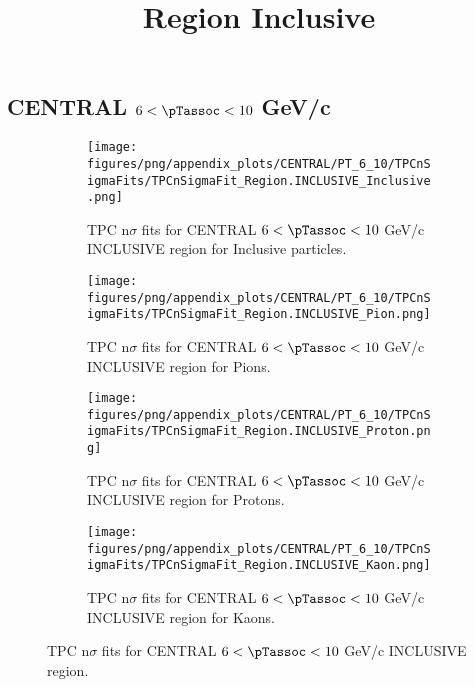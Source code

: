     
            \subsection*{CENTRAL $6 < \pTassoc < 10$ GeV/c}
            \begin{figure}[H]
                \title{Region Inclusive}
                \begin{subfigure}[b]{0.5\textwidth}
                    \centering
                    \texttt{[image: figures/png/appendix\_plots/CENTRAL/PT\_6\_10/TPCnSigmaFits/TPCnSigmaFit\_Region.INCLUSIVE\_Inclusive.png]}
                    \caption{TPC n$\sigma$ fits for CENTRAL $6 < \pTassoc < 10$ GeV/c INCLUSIVE region for Inclusive particles.}
                    \label{fig:appendix_CENTRAL_$6 < \pTassoc < 10$ GeV/c_INCLUSIVE_Inclusive}
                \end{subfigure}
                \begin{subfigure}[b]{0.5\textwidth}
                    \centering
                    \texttt{[image: figures/png/appendix\_plots/CENTRAL/PT\_6\_10/TPCnSigmaFits/TPCnSigmaFit\_Region.INCLUSIVE\_Pion.png]}
                    \caption{TPC n$\sigma$ fits for CENTRAL $6 < \pTassoc < 10$ GeV/c INCLUSIVE region for Pions.}
                    \label{fig:appendix_CENTRAL_$6 < \pTassoc < 10$ GeV/c_INCLUSIVE_Pion}
                \end{subfigure}
                \begin{subfigure}[b]{0.5\textwidth}
                    \centering
                    \texttt{[image: figures/png/appendix\_plots/CENTRAL/PT\_6\_10/TPCnSigmaFits/TPCnSigmaFit\_Region.INCLUSIVE\_Proton.png]}
                    \caption{TPC n$\sigma$ fits for CENTRAL $6 < \pTassoc < 10$ GeV/c INCLUSIVE region for Protons.}
                    \label{fig:appendix_CENTRAL_$6 < \pTassoc < 10$ GeV/c_INCLUSIVE_Proton}
                \end{subfigure}
                \begin{subfigure}[b]{0.5\textwidth}
                    \centering
                    \texttt{[image: figures/png/appendix\_plots/CENTRAL/PT\_6\_10/TPCnSigmaFits/TPCnSigmaFit\_Region.INCLUSIVE\_Kaon.png]}
                    \caption{TPC n$\sigma$ fits for CENTRAL $6 < \pTassoc < 10$ GeV/c INCLUSIVE region for Kaons.}
                    \label{fig:appendix_CENTRAL_$6 < \pTassoc < 10$ GeV/c_INCLUSIVE_Kaon}
                \end{subfigure}
                \caption{TPC n$\sigma$ fits for CENTRAL $6 < \pTassoc < 10$ GeV/c INCLUSIVE region.}
                \label{fig:appendix_CENTRAL_$6 < \pTassoc < 10$ GeV/c_INCLUSIVE}
            \end{figure}
